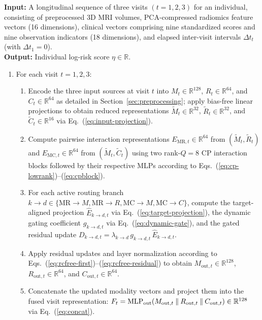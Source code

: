\begin{algorithm}[H]
\caption{Forward pass of the RC-Free Pairwise Fusion model}
\label{alg:rcfree-forward}
\small
\textbf{Input:} A longitudinal sequence of three visits $(t=1,2,3)$ for an individual, consisting of preprocessed 3D MRI volumes, PCA-compressed radiomics feature vectors (16 dimensions), clinical vectors comprising nine standardized scores and nine observation indicators (18 dimensions), and elapsed inter-visit intervals $\Delta t_t$ (with $\Delta t_1=0$).\\
\textbf{Output:} Individual log-risk score $\eta\in\mathbb R$.
\begin{enumerate}[leftmargin=1.2em,label=\arabic*.,itemsep=0.2em]
\item For each visit $t=1,2,3$:
\begin{enumerate}[leftmargin=1.2em,label=\alph*.,itemsep=0.15em]
\item Encode the three input sources at visit $t$ into $M_t\in\mathbb R^{128}$, $R_t\in\mathbb R^{64}$, and $C_t\in\mathbb R^{64}$ as detailed in Section~\ref{sec:preprocessing}; apply bias-free linear projections to obtain reduced representations $\widetilde M_t\in\mathbb R^{32}$, $\widetilde R_t\in\mathbb R^{32}$, and $\widetilde C_t\in\mathbb R^{16}$ via Eq.~(\ref{eq:input-projection}).
\item Compute pairwise interaction representations $E_{\mathrm{MR},t}\in\mathbb R^{64}$ from $(\widetilde M_t,\widetilde R_t)$ and $E_{\mathrm{MC},t}\in\mathbb R^{64}$ from $(\widetilde M_t,\widetilde C_t)$ using two rank-$Q=8$ CP interaction blocks followed by their respective MLPs according to Eqs.~(\ref{eq:cp-lowrank})--(\ref{eq:cpblock}).
\item For each active routing branch $k\to d\in\{\mathrm{MR}\to M,\mathrm{MR}\to R,\mathrm{MC}\to M,\mathrm{MC}\to C\}$, compute the target-aligned projection $\widehat E_{k\to d,t}$ via Eq.~(\ref{eq:target-projection}), the dynamic gating coefficient $g_{k\to d,t}$ via Eq.~(\ref{eq:dynamic-gate}), and the gated residual update $D_{k\to d,t}=\lambda_{k\to d}\,g_{k\to d,t}\,\widehat E_{k\to d,t}$.
\item Apply residual updates and layer normalization according to Eqs.~(\ref{eq:rcfree-first})--(\ref{eq:rcfree-residual}) to obtain $M_{\mathrm{out},t}\in\mathbb R^{128}$, $R_{\mathrm{out},t}\in\mathbb R^{64}$, and $C_{\mathrm{out},t}\in\mathbb R^{64}$.
\item Concatenate the updated modality vectors and project them into the fused visit representation: $F_t=\operatorname{MLP}_{\mathrm{out}}(M_{\mathrm{out},t}\mathbin{\|} R_{\mathrm{out},t}\mathbin{\|} C_{\mathrm{out},t})\in\mathbb R^{128}$ via Eq.~(\ref{eq:concat}).

\end{enumerate}
\end{enumerate}
\end{algorithm}
